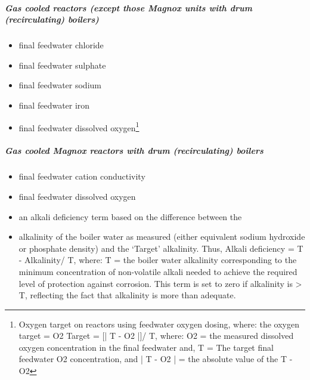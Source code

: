 \subparagraph{Gas cooled reactors (except those Magnox units with drum
  (recirculating)  boilers)}
\begin{itemize}
\item final feedwater chloride
\item final feedwater sulphate
\item final feedwater sodium
\item final feedwater iron
\item final feedwater dissolved oxygen\footnote{Oxygen target on
    reactors using feedwater oxygen dosing, where: the oxygen target =
    O2 Target = [| T - O2 |]/ T, where: O2 = the measured dissolved
    oxygen concentration in the final feedwater and, T = The target final feedwater O2 concentration, and | T - O2 | = the absolute value of the T - O2}
\end{itemize}

\subparagraph{Gas cooled Magnox reactors with drum (recirculating)
  boilers}
\begin{itemize}
\item final feedwater cation conductivity
\item final feedwater dissolved oxygen
\item an alkali deficiency term based on the difference between the
\item alkalinity of the boiler water as measured (either equivalent
  sodium hydroxide or phosphate density) and the ‘Target’
  alkalinity. Thus, Alkali deficiency = T - Alkalinity/ T, where: T =
  the boiler water alkalinity corresponding to the minimum
  concentration of non-volatile alkali needed to achieve the required
  level of protection against corrosion. This term is set to zero if
  alkalinity is > T, reflecting the fact that alkalinity is more than
  adequate.
\end{itemize}

